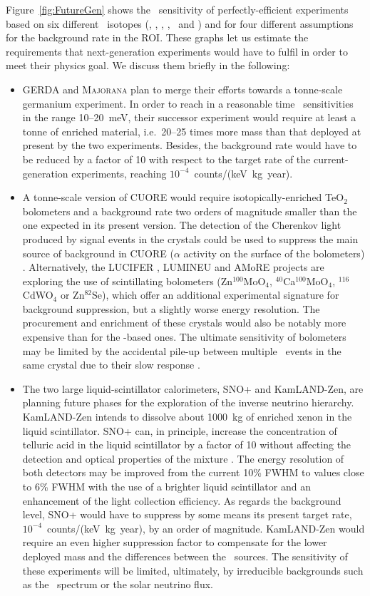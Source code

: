 \documentclass{PoS}
\begin{document}
Figure~\ref{fig:FutureGen} shows the \mbb\ sensitivity of perfectly-efficient experiments based on six different \bb\ isotopes (\GE, \SE, \MO, \CD, \TE\ and \XE) and for four different assumptions for the background rate in the ROI. These graphs let us estimate the requirements that next-generation experiments would have to fulfil in order to meet their physics goal. We discuss them briefly in the following:
\begin{itemize}
\item GERDA and {\scshape Majorana} plan to merge their efforts towards a tonne-scale germanium experiment. In order to reach in a reasonable time \mbb\ sensitivities in the range 10--20~meV, their successor experiment would require at least a tonne of enriched material, i.e.\ 20--25 times more mass than that deployed at present by the two experiments. Besides, the background rate would have to be reduced by a factor of 10 with respect to the target rate of the current-generation experiments, reaching $10^{-4}$~counts/(keV~kg~year).
%
\item A tonne-scale version of CUORE would require isotopically-enriched TeO$_{2}$ bolometers and a background rate two orders of magnitude smaller than the one expected in its present version. The detection of the Cherenkov light produced by signal events in the crystals could be used to suppress the main source of background in CUORE ($\alpha$ activity on the surface of the bolometers) \cite{TabarellideFatis:2009zz, Casali:2014vvt}. Alternatively, the LUCIFER \cite{Beeman:2013sba}, LUMINEU \cite{Barabash:2014una} and AMoRE \cite{Bhang:2012gn} projects are exploring the use of scintillating bolometers (Zn$^{100}$MoO$_{4}$, $^{40}$Ca$^{100}$MoO$_{4}$, $^{116}$CdWO$_{4}$ or Zn$^{82}$Se), which offer an additional experimental signature for background suppression, but a slightly worse energy resolution. The procurement and enrichment of these crystals would also be notably more expensive than for the \TE-based ones. The ultimate sensitivity of bolometers may be limited by the accidental pile-up between multiple \bbtnu\ events in the same crystal due to their slow response \cite{Artusa:2014wnl}. 
%
\item The two large liquid-scintillator calorimeters, SNO+ and KamLAND-Zen, are planning future phases for the exploration of the inverse neutrino hierarchy. KamLAND-Zen intends to dissolve about 1000~kg of enriched xenon in the liquid scintillator. SNO+ can, in principle, increase the concentration of telluric acid in the liquid scintillator by a factor of 10 without affecting the detection and optical properties of the mixture \cite{Biller:2014eha}. The energy resolution of both detectors may be improved from the current 10\% FWHM to values close to 6\% FWHM with the use of a brighter liquid scintillator and an enhancement of the light collection efficiency. As regards the background level, SNO+ would have to suppress by some means its present target rate, $10^{-4}$~counts/(keV~kg~year), by an order of magnitude. KamLAND-Zen would require an even higher suppression factor to compensate for the lower deployed mass and the differences between the \bb\ sources. The sensitivity of these experiments will be limited, ultimately, by irreducible backgrounds such as the \bbtnu\ spectrum or the solar neutrino flux.

\end{itemize}
\end{document}
